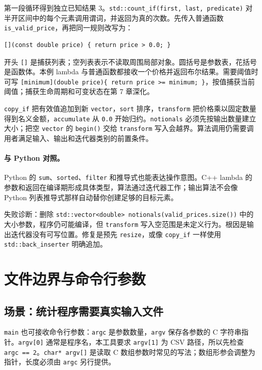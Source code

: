 第一段循环得到独立已知结果 3。\texttt{std::count\_if(first, last, predicate)} 对半开区间中的每个元素调用谓词，并返回为真的次数。先传入普通函数 \texttt{is\_valid\_price}，再把同一规则改写为：

\begin{lstlisting}
[](const double price) { return price > 0.0; }
\end{lstlisting}

开头 \texttt{[]} 是捕获列表；空列表表示不读取周围局部对象。圆括号是参数表，花括号是函数体。本例 lambda 与普通函数都接收一个价格并返回布尔结果。需要阈值时可写 \texttt{[minimum](double price)\{ return price >= minimum; \}}，按值捕获当前阈值；捕获生命周期和可变状态在第 7 章深化。

\texttt{copy\_if} 把有效值追加到新 \texttt{vector}，\texttt{sort} 排序，\texttt{transform} 把价格乘以固定数量得到名义金额，\texttt{accumulate} 从 \texttt{0.0} 开始归约。\texttt{notionals} 必须先按输出数量建立大小；把空 \texttt{vector} 的 \texttt{begin()} 交给 \texttt{transform} 写入会越界。算法调用仍需要调用者满足输入、输出和迭代器类别的前置条件。

\paragraph{与 Python 对照。}
Python 的 \texttt{sum}、\texttt{sorted}、\texttt{filter} 和推导式也能表达操作意图。C++ lambda 的参数和返回在编译期形成具体类型，算法通过迭代器工作；输出算法不会像 Python 列表推导式那样自动替你创建足够的目标元素。

失败诊断：删除 \texttt{std::vector<double> notionals(valid\_prices.size())} 中的大小参数，程序仍可能编译，但 \texttt{transform} 写入空范围是未定义行为。根因是输出迭代器没有可写位置。修复是预先 \texttt{resize}，或像 \texttt{copy\_if} 一样使用 \texttt{std::back\_inserter} 明确追加。

\section{文件边界与命令行参数}

\subsection{场景：统计程序需要真实输入文件}

\texttt{main} 也可接收命令行参数：\texttt{argc} 是参数数量，\texttt{argv} 保存各参数的 C 字符串指针。\texttt{argv[0]} 通常是程序名，本工具要求 \texttt{argv[1]} 为 CSV 路径，所以先检查 \texttt{argc == 2}。\texttt{char* argv[]} 是读取 C 数组参数时常见的写法；数组形参会调整为指针，长度必须由 \texttt{argc} 另行提供。


